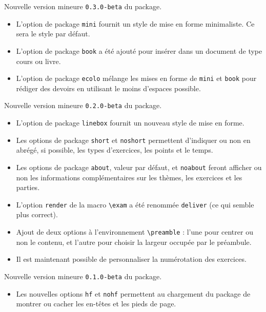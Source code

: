 \documentclass[12pt,a4paper]{scrartcl}
\theoremstyle{definition}
\begin{document}
\begin{description}[leftmargin=1em]
    \setlength\itemsep{1em}

    \item[2017-12-02] Nouvelle version mineure \verb+0.3.0-beta+ du package.
    \begin{itemize}
        \item L'option de package \verb+mini+ fournit un style de mise en forme minimaliste. Ce sera le style par défaut.

        \item L'option de package \verb+book+ a été ajouté pour insérer dans un document de type cours ou livre.

        \item L'option de package \verb+ecolo+ mélange les mises en forme de \verb+mini+ et \verb+book+ pour rédiger des devoirs en utilisant le moins d'espaces possible.        
    \end{itemize}

    \item[2017-11-28] Nouvelle version mineure \verb+0.2.0-beta+ du package.
    \begin{itemize}
        \item L'option de package \verb+linebox+ fournit un nouveau style de mise en forme.

        \item Les options de package \verb+short+ et \verb+noshort+ permettent d'indiquer ou non en abrégé, si possible, les types d'exercices, les points et le temps.

        \item Les options de package \verb+about+, valeur par défaut, et \verb+noabout+ feront afficher ou non les informations complémentaires sur les thèmes, les exercices et les parties.

        \item L'option \verb+render+ de la macro \verb+\exam+ a été renommée \verb+deliver+ (ce qui semble plus correct).

        \item Ajout de deux options à l'environnement \verb+\preamble+ : l'une pour centrer ou non le contenu, et l'autre pour choisir la largeur occupée par le préambule.

        \item Il est maintenant possible de personnaliser la numérotation des exercices.
    \end{itemize}

    \item[2017-11-12] Nouvelle version mineure \verb+0.1.0-beta+ du package.
    \begin{itemize}
        \item Les nouvelles options \verb+hf+ et \verb+nohf+ permettent au chargement du package de montrer ou cacher les en-têtes et les pieds de page.


\end{itemize}
\end{description}
\end{document}
